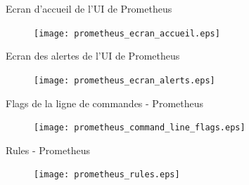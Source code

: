 
\begin{frame}[fragile]{Ecran d'accueil de l'UI de Prometheus}

\begin{figure}
\begin{center}
\texttt{[image: prometheus\_ecran\_accueil.eps]}
\end{center}
\end{figure}

\end{frame}


\begin{frame}[fragile]{Ecran des alertes de l'UI de Prometheus}

\begin{figure}
\begin{center}
\texttt{[image: prometheus\_ecran\_alerts.eps]}
\end{center}
\end{figure}

\end{frame}


\begin{frame}[fragile]{Flags de la ligne de commandes - Prometheus}

\begin{figure}
\begin{center}
\texttt{[image: prometheus\_command\_line\_flags.eps]}
\end{center}
\end{figure}

\end{frame}


\begin{frame}[fragile]{Rules - Prometheus}

\begin{figure}
\begin{center}
\texttt{[image: prometheus\_rules.eps]}
\end{center}
\end{figure}

\end{frame}

